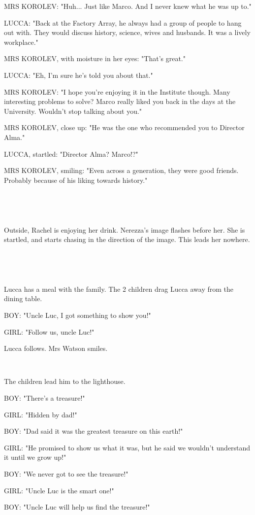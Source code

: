 \documentclass[11pt]{article}
\begin{document}
MRS KOROLEV: "Huh... Just like Marco.
And I never knew what he was up to."

LUCCA: "Back at the Factory Array, he always had a group of people to hang out with.
They would discuss history, science, wives and husbands.
It was a lively workplace."

MRS KOROLEV, with moisture in her eyes: "That's great."

LUCCA: "Eh, I'm sure he's told you about that."

MRS KOROLEV: "I hope you're enjoying it in the Institute though. 
Many interesting problems to solve?
Marco really liked you back in the days at the University.
Wouldn't stop talking about you."

MRS KOROLEV, close up: "He was the one who recommended you to Director Alma."

LUCCA, startled: "Director Alma? Marco!?"

MRS KOROLEV, smiling: "Even across a generation, they were good friends.
Probably because of his liking towards history."

\ 

\ 

Outside, Rachel is enjoying her drink.
Nerezza's image flashes before her.
She is startled, and starts chasing in the direction of the image.
This leads her nowhere.

\ 

\ 

Lucca has a meal with the family. 
The 2 children drag Lucca away from the dining table.

BOY: "Uncle Luc, I got something to show you!"

GIRL: "Follow us, uncle Luc!"

Lucca follows. Mrs Watson smiles.

\ 

The children lead him to the lighthouse.

BOY: "There's a treasure!"

GIRL: "Hidden by dad!"

BOY: "Dad said it was the greatest treasure on this earth!"

GIRL: "He promised to show us what it was, but he said we wouldn't understand it until we grow up!"

BOY: "We never got to see the treasure!" 

GIRL: "Uncle Luc is the smart one!"

BOY: "Uncle Luc will help us find the treasure!"
\end{document}
